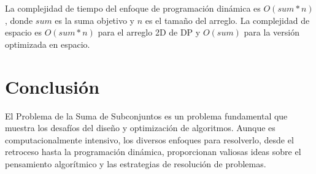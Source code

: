\documentclass{article}
\begin{document}
La complejidad de tiempo del enfoque de programación dinámica es \( O(sum * n) \), donde \( sum \) es la suma objetivo y \( n \) es el tamaño del arreglo. La complejidad de espacio es \( O(sum * n) \) para el arreglo 2D de DP y \( O(sum) \) para la versión optimizada en espacio.



\section{Conclusión}
El Problema de la Suma de Subconjuntos es un problema fundamental que muestra los desafíos del diseño y optimización de algoritmos. Aunque es computacionalmente intensivo, los diversos enfoques para resolverlo, desde el retroceso hasta la programación dinámica, proporcionan valiosas ideas sobre el pensamiento algorítmico y las estrategias de resolución de problemas.
\end{document}
